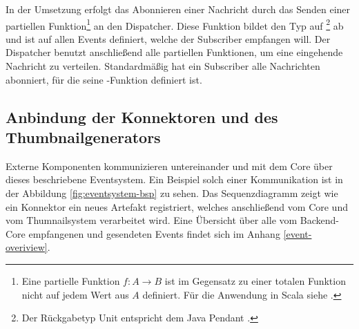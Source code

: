 In der Umsetzung erfolgt das Abonnieren einer Nachricht durch das Senden einer partiellen Funktion\footnote{Eine partielle Funktion $f: A \rightarrow B$ ist im Gegensatz zu einer totalen Funktion nicht auf jedem Wert aus $A$ definiert. Für die Anwendung in Scala siehe \cite{partial-function}.} an den Dispatcher. Diese Funktion bildet den Typ  auf \footnote{Der Rückgabetyp Unit entspricht dem Java Pendant .} ab und ist auf allen Events definiert, welche der Subscriber empfangen will. Der Dispatcher benutzt anschließend alle partiellen Funktionen, um eine eingehende Nachricht zu verteilen. Standardmäßig hat ein Subscriber alle Nachrichten abonniert, für die seine -Funktion definiert ist.

\subsection{Anbindung der Konnektoren und des Thumbnailgenerators}

Externe Komponenten kommunizieren untereinander und mit dem Core über dieses beschriebene Eventsystem. Ein Beispiel solch einer Kommunikation ist in der Abbildung \ref{fig:eventsystem-bsp} zu sehen. Das Sequenzdiagramm zeigt wie ein Konnektor ein neues Artefakt registriert, welches anschließend vom Core und vom Thumnailsystem verarbeitet wird. Eine Übersicht über alle vom Backend-Core empfangenen und gesendeten Events findet sich im Anhang \ref{event-overiview}.

